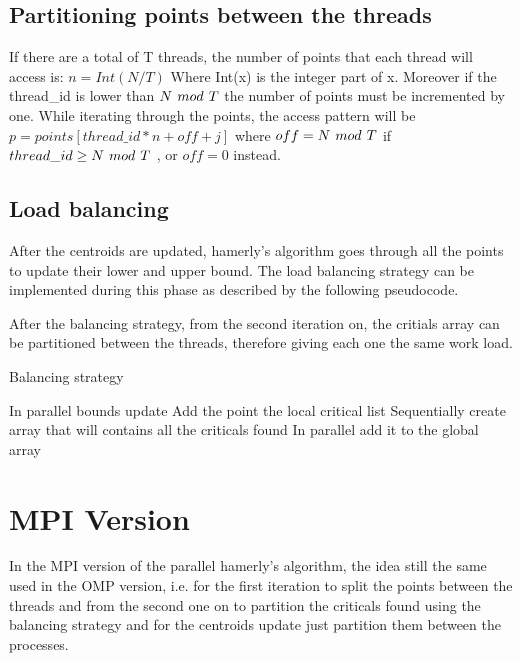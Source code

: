 \documentclass[conference]{IEEEtran}
\begin{document}
\subsection{Partitioning points between the threads}
If there are a total of T threads, the number of points that each thread will access is: $n = Int(N / T)$
Where Int(x) is the integer part of x. Moreover if the thread\_id is lower than $N\hspace{0.05in} mod\hspace{0.05in} T$ the number of points must be incremented by one. While iterating through the points, the access pattern will be $p = points[ thread\_id * n + off + j]$ where $off = N\hspace{0.05in} mod\hspace{0.05in} T$ if $thread\_id \geq N\hspace{0.05in} mod\hspace{0.05in} T $ , or $off = 0$ instead. 

\subsection{Load balancing}

After the centroids are updated, hamerly's algorithm goes through all the points to update their lower and upper bound. The load balancing strategy can be implemented during this phase as described by the following pseudocode.

After the balancing strategy, from the second iteration on, the critials array can be partitioned between the threads, therefore giving each one the same work load.

\begin{algorithm}[H]
    \caption{Balancing strategy}
    \begin{algorithmic}
        \State \Comment In parallel
        \State bounds update
            \State Add the point the local critical list
        \EndIf 
        \EndFor
        \State \Comment Sequentially
        \State create array that will contains all the criticals found
        \State \Comment In parallel
        \State add it to the global array
    \EndFor
    \end{algorithmic}
\end{algorithm}

\section{MPI Version}
In the MPI version of the parallel hamerly's algorithm, the idea still the same used in the OMP version, i.e. for the first iteration to split the points between the threads and from the second one on to partition the criticals found using the balancing strategy and for the centroids update just partition them between the processes. 
\end{document}
